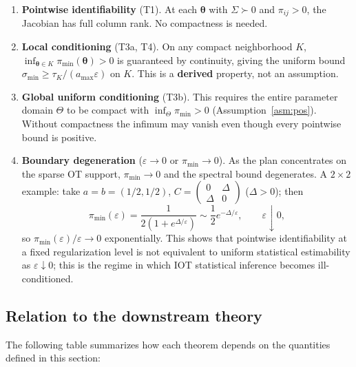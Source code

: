 \documentclass[11pt,a4paper]{article}
\theoremstyle{remark}
\begin{document}
\begin{enumerate}
\item \textbf{Pointwise identifiability} (T1). At each $\bm{\theta}$ with $\Sigma\succ0$
and $\pi_{ij}>0$, the Jacobian has full column rank. No compactness is needed.
\item \textbf{Local conditioning} (T3a, T4). On any compact neighborhood $K$,
$\inf_{\bm{\theta}\in K}\pi_{\min}(\bm{\theta})>0$ is guaranteed by continuity, giving the
uniform bound $\sigma_{\min}\ge\tau_K/(a_{\max}\varepsilon)$ on $K$. This is a
\textbf{derived} property, not an assumption.
\item \textbf{Global uniform conditioning} (T3b). This requires the entire parameter domain
$\Theta$ to be compact with $\inf_{\Theta}\pi_{\min}>0$
(Assumption~\ref{asm:pos}). Without compactness the infimum may vanish even though every
pointwise bound is positive.
\item \textbf{Boundary degeneration} ($\varepsilon\to0$ or $\pi_{\min}\to0$). As the plan
concentrates on the sparse OT support, $\pi_{\min}\to0$ and the spectral bound degenerates.
A $2\times2$ example: take $a=b=(1/2,1/2)$,
$C=\begin{pmatrix}0&\Delta\\\Delta&0\end{pmatrix}$ ($\Delta>0$); then
\[
\pi_{\min}(\varepsilon)=\frac{1}{2(1+e^{\Delta/\varepsilon})}\sim\frac12e^{-\Delta/\varepsilon},\qquad \varepsilon\downarrow0,
\]
so $\pi_{\min}(\varepsilon)/\varepsilon\to0$ exponentially. This shows that pointwise
identifiability at a fixed regularization level is not equivalent to uniform statistical
estimability as $\varepsilon\downarrow0$; this is the regime in which IOT statistical
inference becomes ill-conditioned.
\end{enumerate}

\subsection{Relation to the downstream theory}

The following table summarizes how each theorem depends on the quantities defined in this
section:
\end{document}
